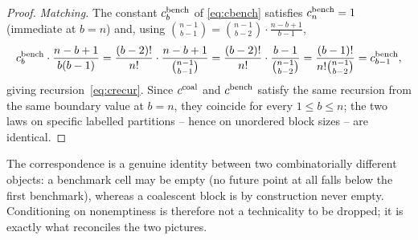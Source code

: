 \documentclass[11pt]{article}
\theoremstyle{plain}
\theoremstyle{definition}
\newtheorem{remark}[theorem]{Remark}
\begin{document}
\begin{proof}
\emph{Matching.} The constant \(c_b^{\rm bench}\) of \eqref{eq:cbench} satisfies \(c_n^{\rm bench}=1\) (immediate at \(b=n\)) and, using  \(\binom{n-1}{b-1}=\binom{n-1}{b-2}\cdot\frac{n-b+1}{b-1}\),
\[
c_b^{\rm bench}\cdot\frac{n-b+1}{b(b-1)}
=\frac{(b-2)!}{n!}\cdot\frac{n-b+1}{\binom{n-1}{b-1}}
=\frac{(b-2)!}{n!}\cdot\frac{b-1}{\binom{n-1}{b-2}}
=\frac{(b-1)!}{n!\binom{n-1}{b-2}}=c_{b-1}^{\rm bench},
\]
giving recursion~\eqref{eq:crecur}. Since \(c^{\rm coal}\) and \(c^{\rm bench}\) satisfy the same recursion from the same boundary value at \(b=n\), they coincide for every \(1\le b\le n\); the two laws on specific labelled partitions -- hence on unordered block sizes -- are identical.
\end{proof}


The correspondence is a genuine identity between two combinatorially different objects: a benchmark cell may be empty (no future point at all falls below the first benchmark), whereas a coalescent block is by construction never empty. Conditioning on nonemptiness is therefore not a technicality to be dropped; it is exactly what reconciles the two pictures.


\end{document}
